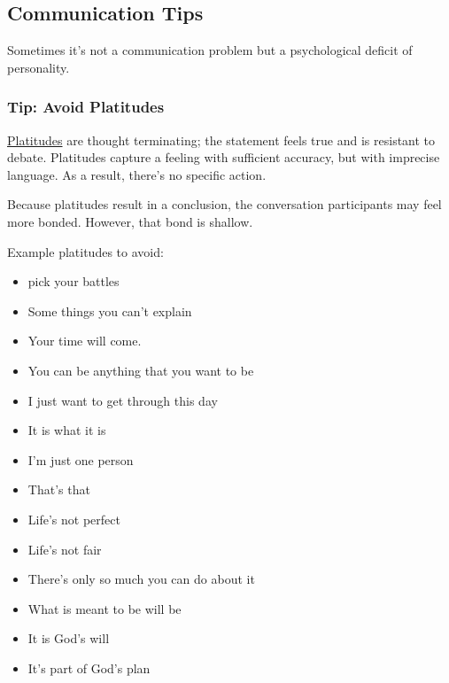 \subsection{Communication Tips}

Sometimes it's not a communication problem but a psychological deficit of personality.


\subsubsection{Tip: Avoid Platitudes}
\href{https://en.wikipedia.org/wiki/Platitude}{Platitudes} are \gls{thought terminating}; the statement feels true and is resistant to debate. Platitudes capture a feeling with sufficient accuracy, but with imprecise language. As a result, there's no specific action.

Because platitudes result in a conclusion, the conversation participants may feel more bonded. However, that bond is shallow.

Example platitudes to avoid:
\begin{itemize}
    \item pick your battles
    \item Some things you can't explain
    \item Your time will come.
    \item You can be anything that you want to be
    \item I just want to get through this day
    \item It is what it is
    \item I'm just one person
    \item That's that
    \item Life's not perfect
    \item Life's not fair
    \item There's only so much you can do about it
    \item What is meant to be will be
    \item It is God's will
    \item It's part of God's plan
\end{itemize}

